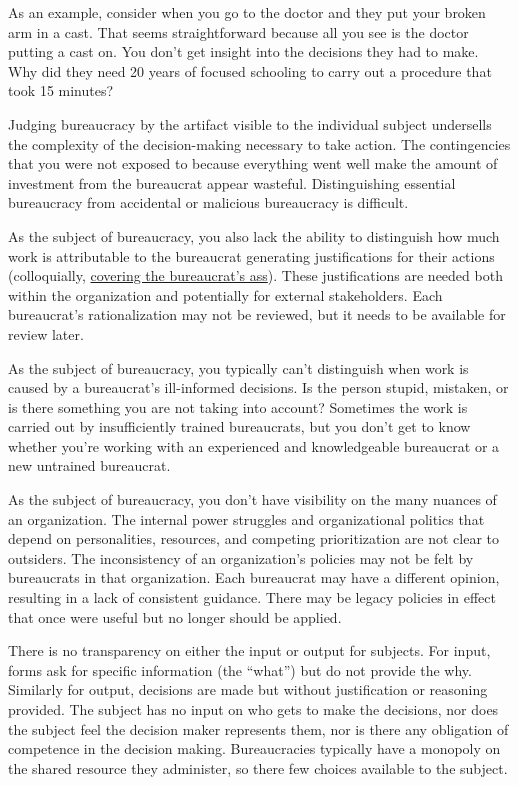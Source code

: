 As an example, consider when you go to the doctor and they put your broken arm in a cast. That seems straightforward because all you see is the doctor putting a cast on. You don't get insight into the decisions they had to make. Why did they need 20 years of focused schooling to carry out a procedure that took 15 minutes?

Judging bureaucracy by the artifact visible to the individual subject undersells the complexity of the decision-making necessary to take action. The contingencies that you were not exposed to because everything went well make the amount of investment from the bureaucrat appear wasteful. Distinguishing essential bureaucracy from accidental or malicious bureaucracy is difficult.

As the subject of bureaucracy, you also lack the ability to distinguish how much work is attributable to the bureaucrat generating justifications for their actions (colloquially, \href{https://en.wikipedia.org/wiki/Cover_your_ass}{covering the bureaucrat's ass}). 
\iftoggle{WPinmargin}{\marginpar{$>$Wikipedia: Cover your ass}}{}
These justifications are needed both within the organization and potentially for external stakeholders. Each bureaucrat's rationalization may not be reviewed, but it needs to be available for review later.

As the subject of bureaucracy, you typically can't distinguish when work is caused by a bureaucrat's ill-informed decisions. Is the person stupid, mistaken, or is there something you are not taking into account?
Sometimes the work is carried out by insufficiently trained bureaucrats, but you don't get to know whether you're working with an experienced and knowledgeable bureaucrat or a new untrained bureaucrat. 

As the subject of bureaucracy, you don't have visibility on the many nuances of an organization. The internal power struggles and organizational politics that depend on personalities, resources, and competing prioritization are not clear to outsiders.
The inconsistency of an organization's policies may not be felt by bureaucrats in that organization. Each bureaucrat may have a different opinion, resulting in a lack of consistent guidance.
There may be legacy policies in effect that once were useful but no longer should be applied.

There is no transparency on either the input or output for subjects. For input, forms ask for specific information (the ``what'') but do not provide the why. Similarly for output, decisions are made but without justification or reasoning provided.
The subject has no input on who gets to make the decisions, nor does the subject feel the decision maker represents them, nor is there any obligation of competence in the decision making. Bureaucracies typically have a monopoly on the shared resource they administer, so there few choices available to the subject.

